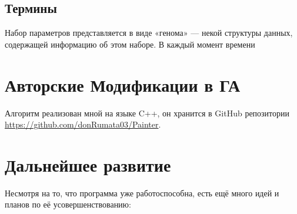 \documentclass[11pt]{article}
\begin{document}
    \subsection{Термины}
    Набор параметров представляется в виде «генома» — некой структуры данных, содержащей информацию об этом наборе.
    В каждый момент времени

    \section{Авторские Модификации  в ГА}

    Алгоритм реализован мной на языке C++, он хранится в GitHub репозитории \href{https://github.com/donRumata03/Painter}{https://github.com/donRumata03/Painter}.

    \section{Дальнейшее развитие}
    Несмотря на то, что программа уже работоспособна, есть ещё много идей и планов по её усовершенствованию:
\end{document}
